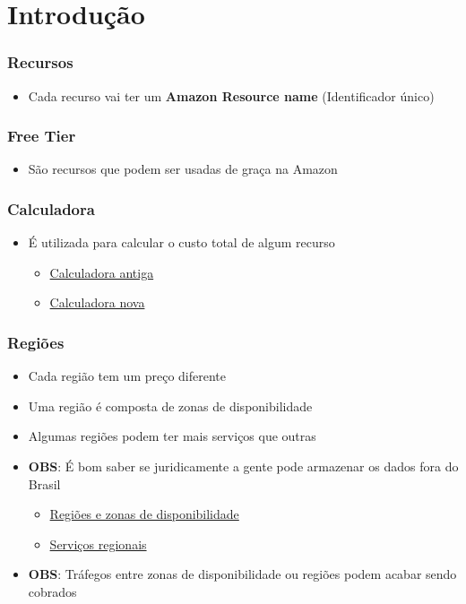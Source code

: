 \section{Introdução}

\begin{frame}
	\frametitle{Recursos}
	\begin{itemize}
		\item Cada recurso vai ter um \textbf{Amazon Resource name} (Identificador único)
	\end{itemize}
\end{frame}

\begin{frame}
	\frametitle{Free Tier}
	\begin{itemize}
		\item São recursos que podem ser usadas de graça na Amazon
	\end{itemize}
\end{frame}

\begin{frame}
	\frametitle{Calculadora}
	\begin{itemize}
		\item É utilizada para calcular o custo total de algum recurso
		\begin{itemize}
		\item \href{https://calculator.s3.amazonaws.com/index.html}{Calculadora antiga}
		\item \href{https://calculator.aws/}{Calculadora nova}
		\end{itemize}
	\end{itemize}
\end{frame}

\begin{frame}
	\frametitle{Regiões}
	\begin{itemize}
		\item Cada região tem um preço diferente
		\item Uma região é composta de zonas de disponibilidade
		\item Algumas regiões podem ter mais serviços que outras
		\item \textbf{OBS}: É bom saber se juridicamente a gente pode armazenar os dados fora do Brasil
			\begin{itemize}
				\item \href{https://aws.amazon.com/pt/about-aws/global-infrastructure/regions_az/}{Regiões e zonas de disponibilidade}
				\item \href{https://aws.amazon.com/pt/about-aws/global-infrastructure/regional-product-services/}{Serviços regionais}
			\end{itemize}
		\item \textbf{OBS}: Tráfegos entre zonas de disponibilidade ou regiões podem acabar sendo cobrados
	\end{itemize}
\end{frame}


